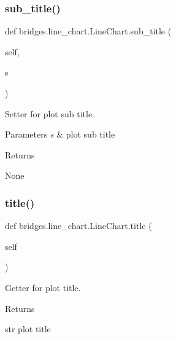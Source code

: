\subsubsection{\texorpdfstring{sub\+\_\+title()}{sub\_title()}\hspace{0.1cm}{\footnotesize\ttfamily [2/2]}}
{\footnotesize\ttfamily def bridges.\+line\+\_\+chart.\+Line\+Chart.\+sub\+\_\+title (\begin{DoxyParamCaption}\item[{}]{self,  }\item[{}]{s }\end{DoxyParamCaption})}



Setter for plot sub title. 


\begin{DoxyParams}{Parameters}
{\em s} & plot sub title \\
\hline
\end{DoxyParams}
\begin{DoxyReturn}{Returns}


None 
\end{DoxyReturn}
\mbox{\label{classbridges_1_1line__chart_1_1_line_chart_ae9a4a1643095d0d0ac4d98e15adbeb3f}} 
\subsubsection{\texorpdfstring{title()}{title()}\hspace{0.1cm}{\footnotesize\ttfamily [1/2]}}
{\footnotesize\ttfamily def bridges.\+line\+\_\+chart.\+Line\+Chart.\+title (\begin{DoxyParamCaption}\item[{}]{self }\end{DoxyParamCaption})}



Getter for plot title. 

\begin{DoxyReturn}{Returns}


str plot title 
\end{DoxyReturn}
\mbox{\label{classbridges_1_1line__chart_1_1_line_chart_adbee0286b07ee001e0c762aa9c147946}} 
